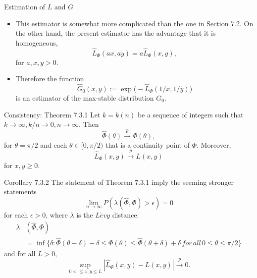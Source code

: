 \documentclass[11pt]{beamer}
\begin{document}
\begin{frame}{Estimation of $L$ and $G$}
\begin{itemize}
\item This estimator is somewhat more complicated than the one in Section 7.2. On the other hand,  the present estimator has the advantage that it is homogeneous,
\begin{displaymath}
\hat{L}_{\Phi}(ax,ay)=a\hat{L}_{\Phi}(x,y),
\end{displaymath}
for $a,x,y>0$.
\item Therefore the function
\begin{displaymath}
\hat{G}_0(x,y):=\exp\big(-\hat{L}_{\Phi}(1/x,1/y)\big)
\end{displaymath}
is an estimator of the max-stable distribution $G_0$.
\end{itemize}

\end{frame}
\begin{frame}{Consistency: Theorem 7.3.1}
Let $k=k(n)$ be a sequence of integers such that $k\to \infty, k/n\to 0, n\to \infty$. Then
\begin{displaymath}
\hat{\Phi}(\theta)\stackrel{p}{\to} \Phi(\theta),
\end{displaymath}
for $\theta=\pi/2$ and each $\theta \in [0,\pi/2)$ that is a continuity point of $\Phi$. Moreover,
\begin{displaymath}
\hat{L}_{\Phi}(x,y) \stackrel{p}{\to}L(x,y)
\end{displaymath}
for $x,y\ge 0$.
\end{frame}
\begin{frame}{Corollary 7.3.2}
The statement of Theorem 7.3.1 imply the seeming stronger statements
\begin{displaymath}
\lim_{n\to \infty} P(\lambda (\hat{\Phi},\Phi)>\epsilon)=0
\end{displaymath}
for each $\epsilon>0$, where $\lambda$ is the $L\acute{e}vy$ distance:
\begin{displaymath}
\begin{split}
\lambda &(\hat{\Phi},\Phi)\\ 
              &=\inf \{\delta:\hat{\Phi}(\theta-\delta)-\delta \le \Phi(\theta)\le \hat{\Phi}(\theta+\delta)+\delta \, for \, all\, 0\le \theta \le \pi/2 \}
\end{split}
\end{displaymath}
and for all $L>0$, 
\begin{displaymath}
\sup_{0<\le x,y\le L } |\hat{L}_{\Phi}(x,y)-L(x,y)|\stackrel{p}{\to}0.
\end{displaymath}


\end{frame}
\end{document}
